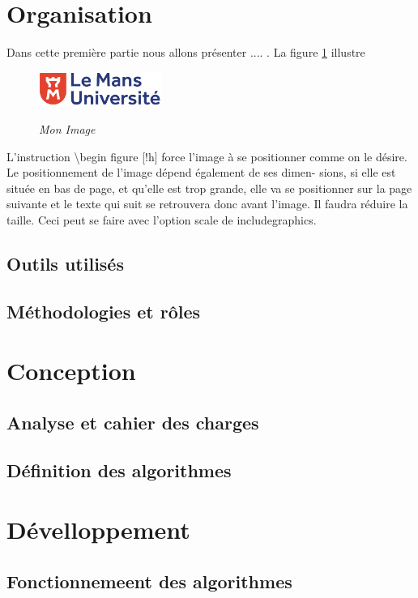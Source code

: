 \documentclass[10pt]{article}
\begin{document}
\section{Organisation}   
Dans cette première partie nous allons présenter .... . La figure \ref{fig1} illustre
\begin{figure}[h]
   \begin{center}
      \includegraphics[width=4cm]{logolemansU.png}\\
      \caption{{\emph{Mon Image}}}
      \label{fig1}
   \end{center}
\end{figure}


L’instruction \textbackslash begin figure [!h] force l’image à se positionner comme
on le désire. Le positionnement de l’image dépend également de ses dimen-
sions, si elle est située en bas de page, et qu’elle est trop grande, elle va se
positionner sur la page suivante et le texte qui suit se retrouvera donc avant
l’image. Il faudra réduire la taille. Ceci peut se faire avec l’option scale de
includegraphics.
      \subsection{Outils utilisés}
      \subsection{Méthodologies et rôles}

\section{Conception}
   \subsection{Analyse et cahier des charges}
   \subsection{Définition des algorithmes}

\section{Dévelloppement}
   \subsection{Fonctionnemeent des algorithmes}
\end{document}
